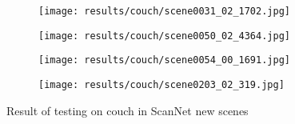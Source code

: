 \begin{figure}[h!]
  \begin{subfigure}[b]{0.32\linewidth}
    \texttt{[image: results/couch/scene0031\_02\_1702.jpg]}
  \end{subfigure}
  \begin{subfigure}[b]{0.32\linewidth}
    \texttt{[image: results/couch/scene0050\_02\_4364.jpg]}
  \end{subfigure}
  \begin{subfigure}[b]{0.32\linewidth}
    \texttt{[image: results/couch/scene0054\_00\_1691.jpg]}
  \end{subfigure}
  \begin{subfigure}[b]{0.32\linewidth}
    \texttt{[image: results/couch/scene0203\_02\_319.jpg]}
  \end{subfigure}
  \caption{Result of testing on couch in ScanNet new scenes}
  \label{fig:result_couch}
\end{figure}

